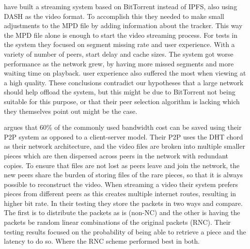 \citeauthor{gazdar2017toward} \cite{gazdar2017toward} have built a streaming system based on BitTorrent instead of \acs{IPFS}, also using \acs{DASH} as the video format. To accomplish this they needed to make small adjustments to the \acs{MPD} file by adding information about the tracker. This way the \acs{MPD} file alone is enough to start the video streaming process. For tests in the system they focused on segment missing rate and user experience. With a variety of number of peers, start delay and cache sizes. The system got worse performance as the network grew, by having more missed segments and more waiting time on playback. user experience also suffered the most when viewing at a high quality. These conclusions contradict our hypotheses that a large network should help offload the system, but this might be due to BitTorrent not being suitable for this purpose, or that their peer selection algorithm is lacking which they themselves point out might be the case.


\citeauthor{nguyen2009p2p} \cite{nguyen2009p2p} argues that 60\% of the commonly used bandwidth cost can be saved using their \ac{P2P} system as opposed to a client-server model. Their \acs{P2P} uses the \ac{DHT} chord as their network architecture, and the video files are broken into multiple smaller pieces which are then dispersed across peers in the network with redundant copies. To ensure that files are not lost as peers leave and join the network, the new peers share the burden of storing files of the rare pieces, so that it is always possible to reconstruct the video. When streaming a video their system prefers pieces from different peers as this creates multiple internet routes, resulting in higher bit rate. In their testing they store the packets in two ways and compare. The first is to distribute the packets as is (non-\acs{NC}) and the other is having the packets be random linear combinations of the original packets (\ac{RNC}). Their testing results focused on the probability of being able to retrieve a piece and the latency to do so. Where the \acs{RNC} scheme performed best in both.


